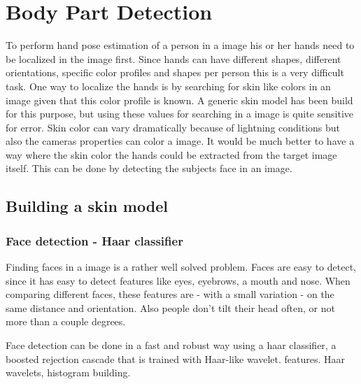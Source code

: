 
\chapter{Body Part Detection}
\label{ch:bodyparts}

To perform hand pose estimation of a person in a image his or her hands need to be localized in the image first. Since hands can have different shapes, different orientations, specific color profiles and shapes per person this is a very difficult task. One way to localize the hands is by searching for skin like colors in an image given that this color profile is known. A generic skin model has been build for this purpose\cite{Jones99statisticalcolor}, but using these values for searching in a image is quite sensitive for error. Skin color can vary dramatically because of lightning conditions but also the cameras properties can color a image. It would be much better to have a way where the skin color the hands could be extracted from the target image itself. This can be done by detecting the subjects face in an image.

\section{Building a skin model}

\subsection*{Face detection - Haar classifier}
Finding faces in a image is a rather well solved problem. Faces are easy to detect, since it has easy to detect features like eyes, eyebrows, a mouth and nose. When comparing different faces, these features are - with a small variation - on the same distance and orientation. Also people don't tilt their head often, or not more than a couple degrees.

Face detection can be done in a fast and robust way using a haar classifier, a boosted rejection cascade that is trained with Haar-like wavelet.
 features\cite{Lienhart02anextended}. Haar wavelets, histogram building.


